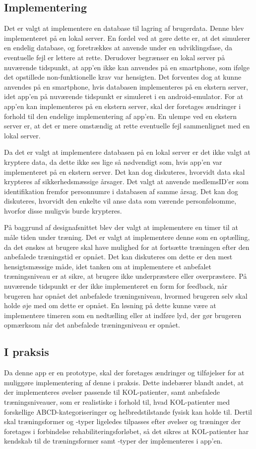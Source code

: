 \subsection{Implementering}
Det er valgt at implementere en database til lagring af brugerdata. Denne blev 
implementeret på en lokal server. En fordel ved at gøre dette er, at det simulerer en endelig database, og foretrækkes at anvende under en udviklingsfase, da eventuelle fejl er lettere at rette. Derudover begrænser en lokal server på nuværende tidspunkt, at app’en ikke kan anvendes på en smartphone, som ifølge det opstillede non-funktionelle krav var hensigten.  Det forventes dog at kunne anvendes på en smartphone, hvis databasen implementeres på en ekstern server, idet app’en på nuværende tidspunkt er simuleret i en android-emulator. For at app’en kan implementeres på en ekstern server, skal der foretages ændringer i forhold til den endelige implementering af app’en. En ulempe ved en ekstern server er, at det er mere omstændig at rette eventuelle fejl sammenlignet med en lokal server. 

Da det er valgt at implementere databasen på en lokal server er det ikke valgt at kryptere data, da dette ikke ses lige så nødvendigt som, hvis app’en var implementeret på en ekstern server. Det kan dog diskuteres, hvorvidt data skal krypteres af sikkerhedsmæssige årsager. Det valgt at anvende medlemsID’er som identifikation fremfor personnumre i databasen af samme årsag. Det kan dog diskuteres, hvorvidt den enkelte vil anse data som værende personfølsomme, hvorfor disse muligvis burde krypteres. 

På baggrund af designafsnittet blev der valgt at implementere en timer til at måle tiden under træning. Det er valgt at implementere denne som en optælling, da det ønskes at brugere skal have mulighed for at fortsætte træningen efter den anbefalede træningstid er opnået. Det kan diskuteres om dette er den mest hensigtsmæssige måde, idet tanken om at implementere et anbefalet træningsniveau er at sikre, at brugere ikke underpræstere eller overpræstere. På nuværende tidspunkt er der ikke implementeret en form for feedback, når brugeren har opnået det anbefalede træningsniveau, hvormed brugeren selv skal holde øje med om dette er opnået. En løsning på dette kunne være at implementere timeren som en nedtælling eller at indføre lyd, der gør brugeren opmærksom når det anbefalede træningsniveau er opnået.

\subsection{I praksis}
Da denne app er en prototype, skal der foretages ændringer og tilføjelser for at muliggøre implementering af denne i praksis. Dette indebærer blandt andet, at der implementeres øvelser passende til KOL-patienter, samt anbefalede træningsniveauer, som er realistiske i forhold til, hvad KOL-patienter med forskellige ABCD-kategoriseringer og helbredstilstande fysisk kan holde til. Dertil skal træningsformer og -typer ligeledes tilpasses efter øvelser og træninger der foretages i forbindelse rehabiliteringsforløbet, så det sikres at KOL-patienter har kendskab til de træningsformer samt -typer der implementeres i app’en.  